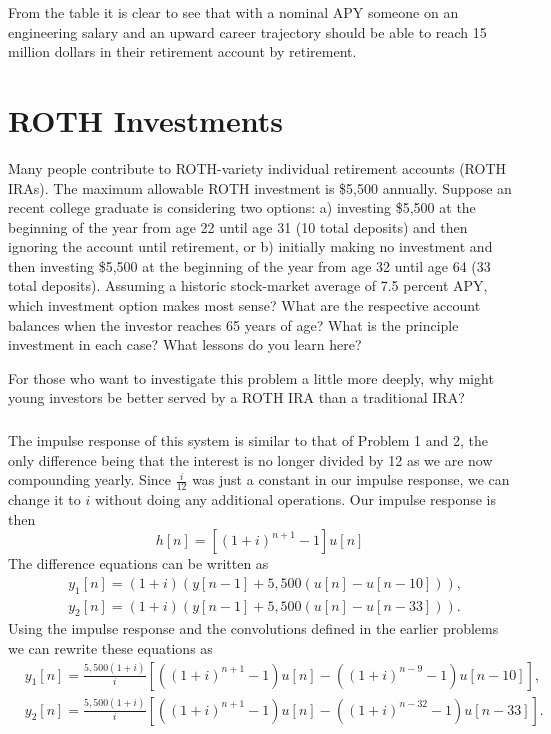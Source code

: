 \documentclass[letterpaper]{report}
\begin{document}
From the table it is clear to see that with a nominal APY someone on an engineering salary and an upward career trajectory should be able to reach 15 million dollars in their retirement account by retirement. 

\section{ROTH Investments}
Many people contribute to ROTH-variety individual retirement accounts (ROTH IRAs). The maximum allowable ROTH investment is \$5,500 annually. Suppose an recent college graduate is considering two options: a) investing \$5,500 at the beginning of the year from age 22 until age 31 (10 total deposits) and then ignoring the account until retirement, or b) initially making no investment and then investing \$5,500 at the beginning of the year from age 32 until age 64 (33 total deposits). Assuming a historic stock-market average of 7.5 percent APY, which investment option makes most sense? What are the respective account balances when the investor reaches 65 years of age? What is the principle investment in each case? What lessons do you learn here?

For those who want to investigate this problem a little more deeply, why might young investors be better served by a ROTH IRA than a traditional IRA?

\subsubsection{}
The impulse response of this system is similar to that of Problem 1 and 2, the only difference being that the interest is no longer divided by 12 as we are now compounding yearly. Since $\frac{i}{12}$ was just a constant in our impulse response, we can change it to $i$ without doing any additional operations. Our impulse response is then
\[
	h[n] = \left[(1+i)^{n+1} - 1 \right]u[n]
\]
The difference equations can be written as
\begin{equation*}
	\begin{split}
		& y_{1}[n] = (1 + i)(y[n-1] + 5,500(u[n] - u[n-10])),  \\
		& y_{2}[n] = (1 + i)(y[n-1] + 5,500(u[n] - u[n-33])).
	\end{split}
\end{equation*}
Using the impulse response and the convolutions defined in the earlier problems we can rewrite these equations as
\begin{equation*}
	\begin{split}
		& y_{1}[n] = \frac{5,500 (1+i)}{i} [((1+i)^{n+1}-1)u[n] - ((1+i)^{n-9}-1)u[n-10]],  \\
		& y_{2}[n] = \frac{5,500 (1+i)}{i} [((1+i)^{n+1}-1)u[n] - ((1+i)^{n-32}-1)u[n-33]].
	\end{split}
\end{equation*}
\end{document}
